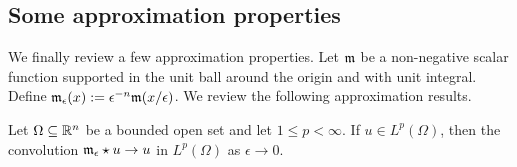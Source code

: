 \documentclass[10pt,a4paper]{article}
\begin{document}
\subsection{Some approximation properties}

We finally review a few approximation properties. 
Let ${\mathfrak m}$ be a non-negative scalar function supported in the unit ball around the origin and with unit integral.
Define ${\mathfrak m}_{\epsilon}(x) := \epsilon^{-n} {\mathfrak m}(x/\epsilon)$. We review the following approximation results.

\begin{lemma}
    Let $\Omega \subseteq {\mathbb R}^{n}$ be a bounded open set and let $1 \leq p < \infty$. 
    If $u \in L^{p}(\Omega)$, then the convolution ${\mathfrak m}_{\epsilon} \star u \rightarrow u$ in $L^{p}(\Omega)$ as $\epsilon \rightarrow 0$.
\end{lemma}

\end{document}
